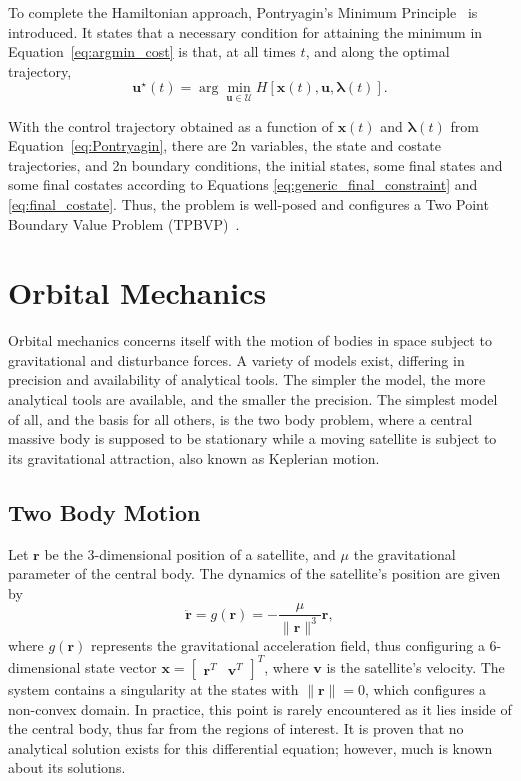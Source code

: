 To complete the Hamiltonian approach, Pontryagin's Minimum Principle~\cite{bertsekas} is introduced. It states that a necessary condition for attaining the minimum in Equation~\eqref{eq:argmin_cost} is that, at all times \(t\), and along the optimal trajectory,
\begin{equation} \label{eq:Pontryagin}
    \mathbf{u}^\star(t) = \arg \min_{\mathbf{u} \in \mathcal{U}} H[\mathbf{x}(t), \mathbf{u}, \mathbf{\lambda}(t)].
\end{equation}

With the control trajectory obtained as a function of \(\mathbf{x}(t)\) and \(\mathbf{\lambda}(t)\) from Equation~\eqref{eq:Pontryagin}, there are 2n variables, the state and costate trajectories, and 2n boundary conditions, the initial states, some final states and some final costates according to Equations \eqref{eq:generic_final_constraint} and \eqref{eq:final_costate}. Thus, the problem is well-posed and configures a Two Point Boundary Value Problem (TPBVP)~\cite{bryson_applied_optimal_control}.

\section{Orbital Mechanics}

Orbital mechanics concerns itself with the motion of bodies in space subject to gravitational and disturbance forces. A variety of models exist, differing in precision and availability of analytical tools. The simpler the model, the more analytical tools are available, and the smaller the precision. The simplest model of all, and the basis for all others, is the two body problem, where a central massive body is supposed to be stationary while a moving satellite is subject to its gravitational attraction, also known as Keplerian motion. 

\subsection{Two Body Motion}

Let \(\mathbf{r}\) be the 3-dimensional position of a satellite, and \(\mu \) the gravitational parameter of the central body. The dynamics of the satellite's position are given by~\cite{curtis2015orbital}
\begin{equation} \label{eq:kepler_dyn}
    \ddot{\mathbf{r}} = g(\mathbf{r}) = -\frac{\mu}{\lVert \mathbf{r} \rVert^3} \mathbf{r},
\end{equation}
where \(g(\mathbf{r})\) represents the gravitational acceleration field, thus configuring a 6-dimensional state vector \(\mathbf{x} = \begin{bmatrix}
    \mathbf{r}^T & \mathbf{v}^T
\end{bmatrix}^T\), where \(\mathbf{v}\) is the satellite's velocity. The system contains a singularity at the states with \(\lVert \mathbf{r} \rVert = 0\), which configures a non-convex domain. In practice, this point is rarely encountered as it lies inside of the central body, thus far from the regions of interest. It is proven that no analytical solution exists for this differential equation; however, much is known about its solutions.

